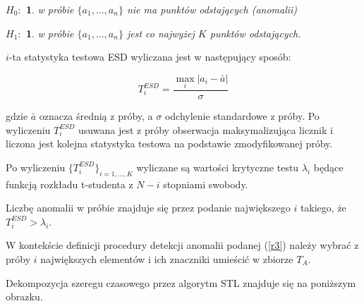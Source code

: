 \documentclass{article}
\begin{document}
\newtheorem{nullhypothesis}{$H_0\colon$}
\newtheorem{althypothesis}{$H_1\colon$}

\begin{nullhypothesis}
  w próbie \(\{a_1, \dots, a_{n}\}\) nie ma punktów odstających (anomalii) 
\end{nullhypothesis}

\begin{althypothesis} 
  w próbie \(\{a_1, \dots, a_{n}\}\) jest co najwyżej \(K\) punktów odstających.
\end{althypothesis}


\(i\)-ta statystyka testowa ESD wyliczana jest w następujący sposób:

\begin{equation*}
T^{ESD}_{i} = \frac{\max_{i}|a_{i} - \bar a|}{\sigma}
\end{equation*}

gdzie \(\bar{a}\) oznacza średnią z próby, a \(\sigma\) odchylenie
standardowe z próby. Po wyliczeniu \(T^{ESD}_{i}\) usuwana jest z próby
obserwacja maksymalizująca licznik i liczona jest kolejna statystyka
testowa na podstawie zmodyfikowanej próby.

Po wyliczeniu \(\{T^{ESD}_{i}\}_{i = 1, \dots, K}\) wyliczane są
wartości krytyczne testu \(\lambda_{i}\) będące funkcją rozkładu
t-studenta z \(N - i\) stopniami swobody.

Liczbę anomalii w próbie znajduje się przez podanie największego \(i\)
takiego, że \(T^{ESD}_{i} > \lambda_{i}\).

W kontekście definicji procedury detekcji anomalii podanej (\ref{r3})
należy wybrać z próby \(i\) największych elementów i ich znaczniki
umieścić w zbiorze \(T_{A}\).

Dekompozycja szeregu czasowego przez algorytm STL znajduje się na
poniższym obrazku.
\end{document}
